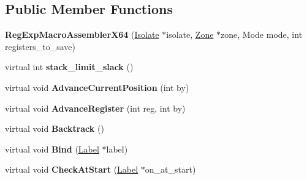 \subsection*{Public Member Functions}
\begin{DoxyCompactItemize}
\item 
{\bfseries Reg\+Exp\+Macro\+Assembler\+X64} (\hyperlink{classv8_1_1internal_1_1_isolate}{Isolate} $\ast$isolate, \hyperlink{classv8_1_1internal_1_1_zone}{Zone} $\ast$zone, Mode mode, int registers\+\_\+to\+\_\+save)\hypertarget{classv8_1_1internal_1_1_reg_exp_macro_assembler_x64_a318cbce38085b779ab2b2e09e3d346c3}{}\label{classv8_1_1internal_1_1_reg_exp_macro_assembler_x64_a318cbce38085b779ab2b2e09e3d346c3}

\item 
virtual int {\bfseries stack\+\_\+limit\+\_\+slack} ()\hypertarget{classv8_1_1internal_1_1_reg_exp_macro_assembler_x64_a890f32d55c67e0ace00628da2c3123a3}{}\label{classv8_1_1internal_1_1_reg_exp_macro_assembler_x64_a890f32d55c67e0ace00628da2c3123a3}

\item 
virtual void {\bfseries Advance\+Current\+Position} (int by)\hypertarget{classv8_1_1internal_1_1_reg_exp_macro_assembler_x64_a33d9ea4cd9c18efd77c9ada92c4e6466}{}\label{classv8_1_1internal_1_1_reg_exp_macro_assembler_x64_a33d9ea4cd9c18efd77c9ada92c4e6466}

\item 
virtual void {\bfseries Advance\+Register} (int reg, int by)\hypertarget{classv8_1_1internal_1_1_reg_exp_macro_assembler_x64_aa390fab168381aec54598561167c3bed}{}\label{classv8_1_1internal_1_1_reg_exp_macro_assembler_x64_aa390fab168381aec54598561167c3bed}

\item 
virtual void {\bfseries Backtrack} ()\hypertarget{classv8_1_1internal_1_1_reg_exp_macro_assembler_x64_a6705b4017ccaf951e81c195bfbaac854}{}\label{classv8_1_1internal_1_1_reg_exp_macro_assembler_x64_a6705b4017ccaf951e81c195bfbaac854}

\item 
virtual void {\bfseries Bind} (\hyperlink{classv8_1_1internal_1_1_label}{Label} $\ast$label)\hypertarget{classv8_1_1internal_1_1_reg_exp_macro_assembler_x64_a01e57fa009090f5d4fbb0a889ead407c}{}\label{classv8_1_1internal_1_1_reg_exp_macro_assembler_x64_a01e57fa009090f5d4fbb0a889ead407c}

\item 
virtual void {\bfseries Check\+At\+Start} (\hyperlink{classv8_1_1internal_1_1_label}{Label} $\ast$on\+\_\+at\+\_\+start)\hypertarget{classv8_1_1internal_1_1_reg_exp_macro_assembler_x64_ad36700d7196bc27a721431c21f3c3977}{}\label{classv8_1_1internal_1_1_reg_exp_macro_assembler_x64_ad36700d7196bc27a721431c21f3c3977}


\end{DoxyCompactItemize}
